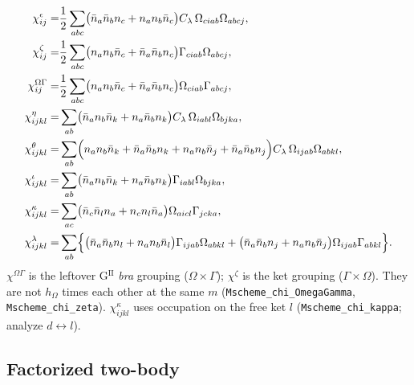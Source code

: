\documentclass[enabledeprecatedfontcommands]{scrartcl}
\newcommand{\codename}[1]{\texttt{#1}}
\begin{document}
\begin{subequations}\label{eq:chi2b}
\begin{align}
\chi^{\epsilon}_{ij}
  =&\frac12\sum_{abc}
    \bigl(\bar n_a\bar n_b n_c+n_a n_b\bar n_c\bigr)
    C_\lambda\,\Omega_{ciab}\Omega_{abcj},\\
\chi^{\zeta}_{ij}
  =&\frac12\sum_{abc}
    \bigl(n_a n_b\bar n_c+\bar n_a\bar n_b n_c\bigr)
    \Gamma_{ciab}\Omega_{abcj},
  \label{eq:chizeta}\\
\chi^{\Omega\Gamma}_{ij}
  =&\frac12\sum_{abc}
    \bigl(n_a n_b\bar n_c+\bar n_a\bar n_b n_c\bigr)
    \Omega_{ciab}\Gamma_{abcj},
  \label{eq:chiOG}\\
\chi^{\eta}_{ijkl}
  =&\sum_{ab}
    \bigl(\bar n_a n_b\bar n_k+n_a\bar n_b n_k\bigr)
    C_\lambda\,\Omega_{iabl}\Omega_{bjka},\\
\chi^{\theta}_{ijkl}
  =&\sum_{ab}
    \Bigl(
      n_a n_b\bar n_k+\bar n_a\bar n_b n_k
     +n_a n_b\bar n_j+\bar n_a\bar n_b n_j
    \Bigr)
    C_\lambda\,\Omega_{ijab}\Omega_{abkl},\\
\chi^{\iota}_{ijkl}
  =&\sum_{ab}
    \bigl(\bar n_a n_b\bar n_k+n_a\bar n_b n_k\bigr)
    \Gamma_{iabl}\Omega_{bjka},\\
\chi^{\kappa}_{ijkl}
  =&\sum_{ac}
    \bigl(\bar n_c\bar n_l n_a+n_c n_l\bar n_a\bigr)
    \Omega_{aicl}\Gamma_{jcka},
  \label{eq:chikappa}\\
\chi^{\lambda}_{ijkl}
  =&\sum_{ab}\Bigl\{
    \bigl(\bar n_a\bar n_b n_l+n_a n_b\bar n_l\bigr)
    \Gamma_{ijab}\Omega_{abkl}
   +\bigl(\bar n_a\bar n_b n_j+n_a n_b\bar n_j\bigr)
    \Omega_{ijab}\Gamma_{abkl}
  \Bigr\}.
\end{align}
\end{subequations}
$\chi^{\Omega\Gamma}$ is the leftover G$^{\mathrm{II}}$ \emph{bra} grouping
($\Omega\times\Gamma$); $\chi^\zeta$ is the ket grouping
($\Gamma\times\Omega$). They are not $h_\Omega$ times each other at the same
$m$ (\codename{Mscheme\_chi\_OmegaGamma}, \codename{Mscheme\_chi\_zeta}).
$\chi^\kappa_{ijkl}$ uses occupation on the free ket $l$
(\codename{Mscheme\_chi\_kappa}; analyze $d\leftrightarrow l$).

\subsection{Factorized two-body}
\label{sec:fact2b}
\end{document}
